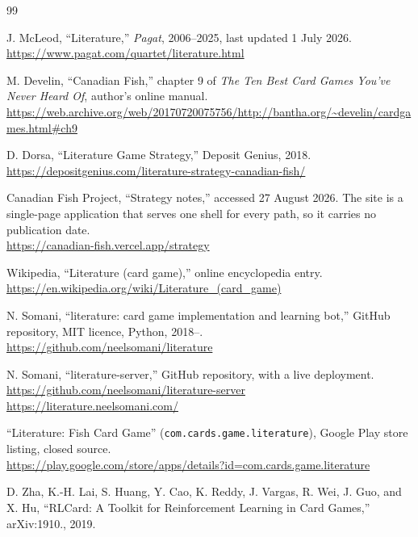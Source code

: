 \begin{thebibliography}{99}
\setlength{\itemsep}{0pt}\setlength{\parsep}{0pt}

J. McLeod, ``Literature,'' \emph{Pagat}, 2006--2025, last updated 1 July 2026.\\
\url{https://www.pagat.com/quartet/literature.html}

M. Develin, ``Canadian Fish,'' chapter 9 of \emph{The Ten Best Card Games You've
Never Heard Of}, author's online manual.\\
\url{https://web.archive.org/web/20170720075756/http://bantha.org/~develin/cardgames.html\#ch9}

D. Dorsa, ``Literature Game Strategy,'' Deposit Genius, 2018.\\
\url{https://depositgenius.com/literature-strategy-canadian-fish/}

Canadian Fish Project, ``Strategy notes,'' accessed 27 August 2026. The site is a
single-page application that serves one shell for every path, so it carries no publication date.\\
\url{https://canadian-fish.vercel.app/strategy}

Wikipedia, ``Literature (card game),'' online encyclopedia entry.\\
\url{https://en.wikipedia.org/wiki/Literature_(card_game)}

N. Somani, ``literature: card game implementation and learning bot,'' GitHub
repository, MIT licence, Python, 2018--.\\
\url{https://github.com/neelsomani/literature}

N. Somani, ``literature-server,'' GitHub repository, with a live deployment.\\
\url{https://github.com/neelsomani/literature-server}\\
\url{https://literature.neelsomani.com/}

``Literature: Fish Card Game'' (\texttt{com.cards.game.literature}), Google Play
store listing, closed source.\\
\url{https://play.google.com/store/apps/details?id=com.cards.game.literature}

D. Zha, K.-H. Lai, S. Huang, Y. Cao, K. Reddy, J. Vargas, R. Wei, J. Guo, and
X. Hu, ``RLCard: A Toolkit for Reinforcement Learning in Card Games,''
arXiv:1910., 2019.


\end{thebibliography}

